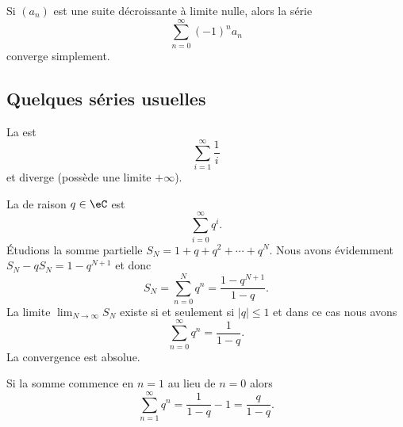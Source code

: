 \begin{corollary}       \label{CoreMjIfw}
    Si \( (a_n)\) est une suite décroissante à limite nulle, alors la série
  \begin{equation}
    \sum_{n=0}^\infty {(-1)}^n a_n
  \end{equation}
  converge simplement.
\end{corollary}

\subsection{Quelques séries usuelles}
\label{SUBSECooDTYHooZjXXJf}

\begin{example}
    La  est
    \begin{equation}
        \sum_{i=1}^\infty \frac1i
    \end{equation}
    et diverge (possède une limite $+\infty$).
\end{example}

\begin{example} \label{ExZMhWtJS}
    La  de raison $q \in \eC$ est
    \begin{equation}    \label{EqZQTGooIWEFxL}
        \sum_{i=0}^\infty q^i.
    \end{equation}
    Étudions la somme partielle \( S_N=1+q+q^2+\cdots +q^{N}\). Nous avons évidemment $S_N-qS_N=1-q^{N+1}$ et donc
    \begin{equation}    \label{EqASYTiCK}
        S_N=\sum_{n=0}^Nq^n=\frac{ 1-q^{N+1} }{ 1-q }.
    \end{equation}
    La limite \( \lim_{N\to \infty} S_N\) existe si et seulement si \( | q |\leq 1\) et dans ce cas nous avons
    \begin{equation}    \label{EqRGkBhrX}
        \sum_{n=0}^{\infty}q^n=\frac{ 1 }{ 1-q }.
    \end{equation}
    La convergence est absolue.

    Si la somme commence en \( n=1\) au lieu de \( n=0\) alors
    \begin{equation}        \label{EqPZOWooMdSRvY}
        \sum_{n=1}^{\infty}q^n=\frac{1}{ 1-q }-1=\frac{ q }{ 1-q }.
    \end{equation}
\end{example}


